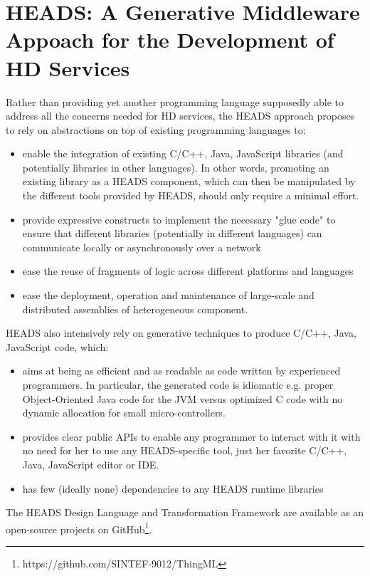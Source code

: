 \section{HEADS: A Generative Middleware Appoach for the Development of HD Services}

Rather than providing yet another programming language supposedly able to address all the concerns needed for HD services, the HEADS approach proposes to rely on abstractions on top of existing programming languages to: 
\begin{itemize}
\item enable the integration of existing C/C++, Java, JavaScript libraries (and potentially libraries in other languages). In other words, promoting an existing library as a HEADS component, which can then be manipulated by the different tools provided by HEADS, should only require a minimal effort. 
\item provide expressive constructs to implement the necessary "glue code" to ensure that different libraries (potentially in different languages) can communicate locally or asynchronously over a network 
\item ease the reuse of fragments of logic across different platforms and languages 
\item ease the deployment, operation and maintenance of large-scale and distributed assemblies of heterogeneous component.
\end{itemize}

HEADS also intensively rely on generative techniques to produce C/C++, Java, JavaScript code, which: 
\begin{itemize}
	\item aims at being as efficient and as readable as code written by experienced programmers. In particular, the generated code is idiomatic e.g. proper Object-Oriented Java code for the JVM versus optimized C code with no dynamic allocation for small micro-controllers. 
\item provides clear public APIs to enable any programmer to interact with it with no need for her to use any HEADS-specific tool, just her favorite C/C++, Java, JavaScript editor or IDE. 
\item has few (ideally none) dependencies to any HEADS runtime libraries
\end{itemize}

The HEADS Design Language and Transformation Framework are available as an open-source projects on GitHub\footnote{https://github.com/SINTEF-9012/ThingML}.

